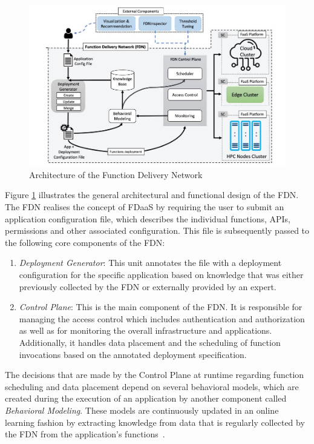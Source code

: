 \begin{figure}[H]
    \centering
    \includegraphics[width=1\textwidth]{./figures/fdn}
    \caption{Architecture of the Function Delivery Network}
    \label{fig:fdn}
\end{figure}

Figure \ref{fig:fdn} illustrates the general architectural and functional design of the FDN. The FDN realises the concept of FDaaS by requiring the user to submit an application configuration file, which describes the individual functions, APIs, permissions and other associated configuration. This file is subsequently passed to the following core components of the FDN:

\begin{enumerate}
    \item \textit{Deployment Generator}: This unit annotates the file with a deployment configuration for the specific application based on knowledge that was either previously collected by the FDN or externally provided by an expert.
    \item \textit{Control Plane}: This is the main component of the FDN. It is responsible for managing the access control which includes authentication and authorization as well as for monitoring the overall infrastructure and applications. Additionally, it handles data placement and the scheduling of function invocations based on the annotated deployment specification.
\end{enumerate}

The decisions that are made by the Control Plane at runtime regarding function scheduling and data placement depend on several behavioral models, which are created during the execution of an application by another component called \textit{Behavioral Modeling}. These models are continuously updated in an online learning fashion by extracting knowledge from data that is regularly collected by the FDN from the application's functions~\parencite{fdn}.

